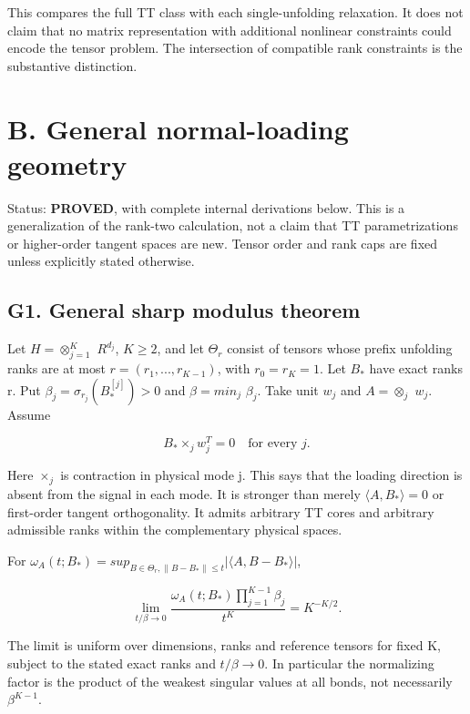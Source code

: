 \documentclass[
  11pt,
]{article}
\begin{document}
This compares the full TT class with each single-unfolding relaxation.
It does not claim that no matrix representation with additional
nonlinear constraints could encode the tensor problem. The intersection
of compatible rank constraints is the substantive distinction.

\newpage

\section{B. General normal-loading
geometry}\label{b.-general-normal-loading-geometry}

Status: \textbf{PROVED}, with complete internal derivations below. This
is a generalization of the rank-two calculation, not a claim that TT
parametrizations or higher-order tangent spaces are new. Tensor order
and rank caps are fixed unless explicitly stated otherwise.

\subsection{G1. General sharp modulus
theorem}\label{g1.-general-sharp-modulus-theorem}

Let \(H=\otimes _{j=1}^K\) \(R^{d_j}\), \(K\ge 2\), and let
\(\Theta _r\) consist of tensors whose prefix unfolding ranks are at
most \(r=(r_1,...,r_{K-1})\), with \(r_0=r_K=1\). Let \(B_*\) have exact
ranks r. Put \(\beta _j=\sigma _{r_j}(B_*^{[j]})>0\) and
\(\beta =min_j\) \(\beta _j\). Take unit \(w_j\) and \(A=\otimes _j\)
\(w_j\). Assume

\[
 B_*\times_j w_j^T=0\quad\text{for every }j.
\]

Here \(\times _j\) is contraction in physical mode j. This says that the
loading direction is absent from the signal in each mode. It is stronger
than merely \(\langle A,B_*\rangle =0\) or first-order tangent
orthogonality. It admits arbitrary TT cores and arbitrary admissible
ranks within the complementary physical spaces.

For
\(\omega _A(t;B_*)=sup_{B\in \Theta _r, \|B-B_*\|\le t}|\langle A,B-B_*\rangle |\),

\[
 \lim_{t/\beta\to0}
 \frac{\omega_A(t;B_*)\prod_{j=1}^{K-1}\beta_j}{t^K}
       =K^{-K/2}. \tag{G1}
\]

The limit is uniform over dimensions, ranks and reference tensors for
fixed K, subject to the stated exact ranks and \(t/\beta \to 0\). In
particular the normalizing factor is the product of the weakest singular
values at all bonds, not necessarily \(\beta ^{K-1}\).
\end{document}
